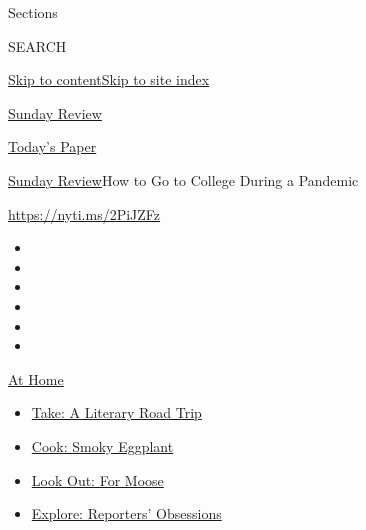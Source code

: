 Sections

SEARCH

\protect\hyperlink{site-content}{Skip to
content}\protect\hyperlink{site-index}{Skip to site index}

\href{https://www.nytimes3xbfgragh.onion/section/opinion/sunday}{Sunday
Review}

\href{https://myaccount.nytimes3xbfgragh.onion/auth/login?response_type=cookie\&client_id=vi}{}

\href{https://www.nytimes3xbfgragh.onion/section/todayspaper}{Today's
Paper}

\href{/section/opinion/sunday}{Sunday Review}\textbar{}How to Go to
College During a Pandemic

\href{https://nyti.ms/2PiJZFz}{https://nyti.ms/2PiJZFz}

\begin{itemize}
\item
\item
\item
\item
\item
\item
\end{itemize}

\href{https://www.nytimes3xbfgragh.onion/spotlight/at-home?action=click\&pgtype=Article\&state=default\&region=TOP_BANNER\&context=at_home_menu}{At
Home}

\begin{itemize}
\tightlist
\item
  \href{https://www.nytimes3xbfgragh.onion/2020/07/28/books/time-for-a-literary-road-trip.html?action=click\&pgtype=Article\&state=default\&region=TOP_BANNER\&context=at_home_menu}{Take:
  A Literary Road Trip}
\item
  \href{https://www.nytimes3xbfgragh.onion/2020/07/29/magazine/bored-with-your-home-cooking-some-smoky-eggplant-will-fix-that.html?action=click\&pgtype=Article\&state=default\&region=TOP_BANNER\&context=at_home_menu}{Cook:
  Smoky Eggplant}
\item
  \href{https://www.nytimes3xbfgragh.onion/2020/07/27/travel/moose-michigan-isle-royale.html?action=click\&pgtype=Article\&state=default\&region=TOP_BANNER\&context=at_home_menu}{Look
  Out: For Moose}
\item
  \href{https://www.nytimes3xbfgragh.onion/interactive/2020/at-home/even-more-reporters-editors-diaries-lists-recommendations.html?action=click\&pgtype=Article\&state=default\&region=TOP_BANNER\&context=at_home_menu}{Explore:
  Reporters' Obsessions}
\end{itemize}


